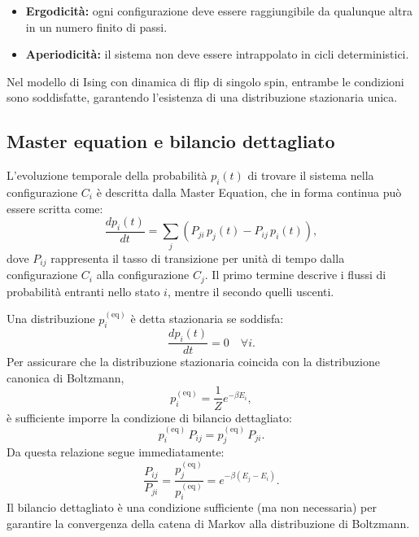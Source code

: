 \begin{itemize}
    \item \textbf{Ergodicità:} ogni configurazione deve essere raggiungibile da qualunque 
    altra in un numero finito di passi.
    \item \textbf{Aperiodicità:} il sistema non deve essere intrappolato in cicli deterministici.
\end{itemize}

Nel modello di Ising con dinamica di flip di singolo spin, entrambe le condizioni sono 
soddisfatte, garantendo l'esistenza di una distribuzione stazionaria unica.

\subsection{Master equation e bilancio dettagliato}

L'evoluzione temporale della probabilità $p_i(t)$ di trovare il sistema nella 
configurazione $C_i$ è descritta dalla Master Equation, che in forma continua può essere 
scritta come:
\begin{equation}
\frac{d p_i(t)}{dt} = \sum_{j} \left( P_{ji}\, p_j(t) - P_{ij}\, p_i(t) \right),
\end{equation}
dove $P_{ij}$ rappresenta il tasso di transizione per unità di tempo dalla configurazione 
$C_i$ alla configurazione $C_j$. Il primo termine descrive i flussi di probabilità 
entranti nello stato $i$, mentre il secondo quelli uscenti.

Una distribuzione $p_i^{(\text{eq})}$ è detta stazionaria se soddisfa:
\begin{equation}
\frac{d p_i(t)}{dt} = 0 \quad \forall i.
\end{equation}
Per assicurare che la distribuzione stazionaria coincida con la distribuzione canonica 
di Boltzmann,
\begin{equation}
p_i^{(\text{eq})} = \frac{1}{Z} e^{-\beta E_i},
\end{equation}
è sufficiente imporre la condizione di bilancio dettagliato:
\begin{equation}
p_i^{(\text{eq})}\, P_{ij} = p_j^{(\text{eq})}\, P_{ji}.
\end{equation}
Da questa relazione segue immediatamente:
\begin{equation}
\frac{P_{ij}}{P_{ji}} = \frac{p_j^{(\text{eq})}}{p_i^{(\text{eq})}} 
= e^{-\beta (E_j - E_i)}.
\end{equation}
Il bilancio dettagliato è una condizione sufficiente (ma non necessaria) per garantire 
la convergenza della catena di Markov alla distribuzione di Boltzmann.

